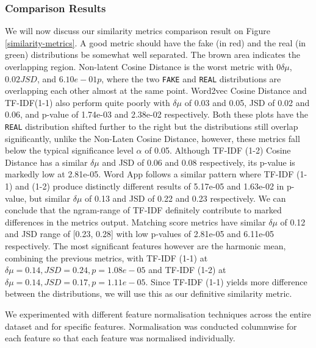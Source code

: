 \documentclass{article}
\begin{document}
\subsubsection{Comparison Results}
We will now discuss our similarity metrics comparison result on Figure \ref{similarity-metrics}. A good metric should have the fake (in red) and the real (in green) distributions be somewhat well separated. The brown area indicates the overlapping region. Non-latent Cosine Distance is the worst metric with $0 \delta \mu$, $0.02 JSD$, and $6.10e-01 p$, where the two \texttt{FAKE} and \texttt{REAL} distributions are overlapping each other almost at the same point. Word2vec Cosine Distance and TF-IDF(1-1) also perform quite poorly with $\delta \mu$ of 0.03 and 0.05, JSD of 0.02 and 0.06, and p-value of 1.74e-03 and 2.38e-02 respectively. Both these plots have the \texttt{REAL} distribution shifted further to the right but the distributions still overlap significantly, unlike the Non-Laten Cosine Distance, however, these metrics fall below the typical significance level $\alpha$ of 0.05. Although TF-IDF (1-2) Cosine Distance has a similar $\delta \mu$ and JSD of 0.06 and 0.08 respectively, its p-value is markedly low at 2.81e-05. Word App follows a similar pattern where TF-IDF (1-1) and (1-2) produce distinctly different results of 5.17e-05 and 1.63e-02 in p-value, but similar $\delta \mu$ of 0.13 and JSD of 0.22 and 0.23 respectively. We can conclude that the ngram-range of TF-IDF definitely contribute to marked differences in the metrics output. Matching score metrics have similar $\delta \mu$ of 0.12 and JSD range of [0.23, 0.28] with low p-values of 2.81e-05 and 6.11e-05 respectively. The most significant features however are the harmonic mean, combining the previous metrics, with TF-IDF (1-1) at $\delta \mu = 0.14, JSD = 0.24, p = 1.08e-05$ and TF-IDF (1-2) at $\delta \mu = 0.14, JSD = 0.17, p = 1.11e-05$. Since TF-IDF (1-1) yields more difference between the distributions, we will use this as our definitive similarity metric.




We experimented with different feature normalisation techniques across the entire dataset and for specific features. Normalisation was conducted columnwise for each feature so that each feature was normalised individually.
\end{document}
